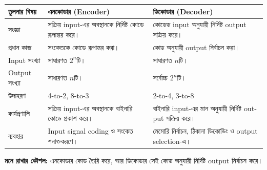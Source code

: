 \begin{center}

\footnotesize

\renewcommand{\arraystretch}{1.08}

\begin{tabularx}
{\textwidth}
{|L{0.18\textwidth}|Y|Y|}

\hline


\textbf{তুলনার বিষয়}
&
\textbf{এনকোডার (\textenglish{Encoder})}
&
\textbf{ডিকোডার (\textenglish{Decoder})}
\\
\hline

সংজ্ঞা
&
সক্রিয় \textenglish{input}-এর অবস্থানকে
নির্দিষ্ট কোডে রূপান্তর করে।
&
কোডেড \textenglish{input} অনুযায়ী
নির্দিষ্ট \textenglish{output} সক্রিয় করে।
\\
\hline

প্রধান কাজ
&
সংকেতকে কোডে রূপান্তর করা।
&
কোড অনুযায়ী \textenglish{output} নির্বাচন করা।
\\
\hline

\textenglish{Input} সংখ্যা
&
সাধারণত \(2^n\)টি।
&
সাধারণত \(n\)টি।
\\
\hline

\textenglish{Output} সংখ্যা
&
সাধারণত \(n\)টি।
&
সর্বোচ্চ \(2^n\)টি।
\\
\hline

উদাহরণ
&
\textenglish{4-to-2},
\textenglish{8-to-3}
&
\textenglish{2-to-4},
\textenglish{3-to-8}
\\
\hline

কার্যপ্রণালি
&
সক্রিয় \textenglish{input}-এর অবস্থানকে
বাইনারি কোডে প্রকাশ করে।
&
বাইনারি \textenglish{input}-এর মান অনুযায়ী
নির্দিষ্ট \textenglish{output} সক্রিয় করে।
\\
\hline

ব্যবহার
&
\textenglish{Input signal coding}
ও সংকেত শনাক্তকরণে।
&
মেমোরি নির্বাচন, ঠিকানা ডিকোডিং
ও \textenglish{output selection}-এ।
\\
\hline

\end{tabularx}

\end{center}

\par\begingroup


\textbf{মনে রাখার কৌশল:}
এনকোডার কোড তৈরি করে,
আর ডিকোডার সেই কোড অনুযায়ী
নির্দিষ্ট \textenglish{output} নির্বাচন করে।

\par\endgroup


